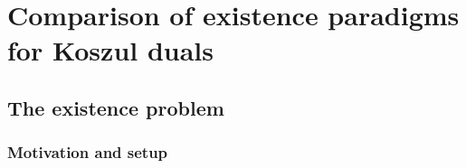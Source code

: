 
\chapter{Comparison of existence paradigms for Koszul duals}
\label{app:existence-criteria}


\begin{abstract}
This appendix compares the strict finite-type existence theorems of the
core monograph with the frontier completion package of
Appendix~\ref{app:nilpotent-completion} and with classical
existence/non-existence criteria in the literature.  It is comparative,
not normative: its role is to situate the monograph's theorematic core
and its completion frontier inside the broader quadratic/curved Koszul
literature, not to legislate a single monograph-wide ``if and only if''
criterion.
\end{abstract}


\section{The existence problem}
\label{sec:existence-problem-statement}

\subsection{Motivation and setup}

